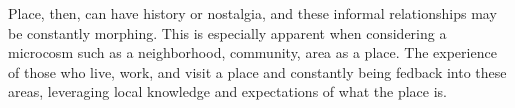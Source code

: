 Place, then, can have history or nostalgia, and these informal relationships may be constantly morphing\cite{Roche2012}. %
This is especially apparent when considering a microcosm such as a neighborhood, community, area as a place. The experience of those who live, work, and visit a place and constantly being fedback into these areas, leveraging local knowledge and expectations of what the place is\cite{Cai2016}. %

